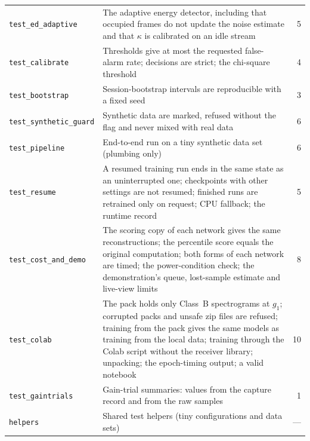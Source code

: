 \begin{singlespace}
\begin{table}[tbp]
\begin{tabularx}{\textwidth}{@{} >{\raggedright\arraybackslash}p{4.1cm} >{\raggedright\arraybackslash}X r @{}}
    \texttt{test\_ed\_adaptive} & The adaptive energy detector, including that occupied frames do not update the noise estimate and that $\kappa$ is calibrated on an idle stream & 5 \\
    \texttt{test\_calibrate} & Thresholds give at most the requested false-alarm rate; decisions are strict; the chi-square threshold & 4 \\
    \texttt{test\_bootstrap} & Session-bootstrap intervals are reproducible with a fixed seed & 3 \\
    \texttt{test\_synthetic\_guard} & Synthetic data are marked, refused without the flag and never mixed with real data & 6 \\
    \texttt{test\_pipeline} & End-to-end run on a tiny synthetic data set (plumbing only) & 6 \\
    \texttt{test\_resume} & A resumed training run ends in the same state as an uninterrupted one; checkpoints with other settings are not resumed; finished runs are retrained only on request; CPU fallback; the runtime record & 5 \\
    \texttt{test\_cost\_and\_demo} & The scoring copy of each network gives the same reconstructions; the percentile score equals the original computation; both forms of each network are timed; the power-condition check; the demonstration's queue, lost-sample estimate and live-view limits & 8 \\
    \texttt{test\_colab} & The pack holds only Class~B spectrograms at $g_1$; corrupted packs and unsafe zip files are refused; training from the pack gives the same models as training from the local data; training through the Colab script without the receiver library; unpacking; the epoch-timing output; a valid notebook & 10 \\
    \texttt{test\_gaintrials} & Gain-trial summaries: values from the capture record and from the raw samples & 1 \\
    \texttt{helpers} & Shared test helpers (tiny configurations and data sets) & --- \\
    \bottomrule
  \end{tabularx}
\end{table}

\end{singlespace}
